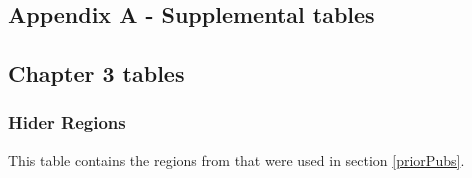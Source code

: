 \documentclass[]{report}
\begin{document}
\begin{appendices}
	\renewcommand{\thesection}{\Alph{chapter}\arabic{section}}
	\renewcommand{\thetable}{S\arabic{table}}
	\renewcommand{\thefigure}{S\arabic{figure}}
	\setcounter{figure}{0}
	\setcounter{table}{0}



\chapter{Appendix A - Supplemental
tables}\label{appendix-a---supplemental-tables}

\section{Chapter 3 tables}\label{chapter-3-tables}

\subsection{Hider Regions}\label{hider-regions}

This table contains the regions from \citet{Hider2013} that were used in
section \ref{priorPubs}.

\begin{landscape}\begingroup\fontsize{8}{10}\selectfont


\end{landscape}
\end{appendices}
\end{document}
